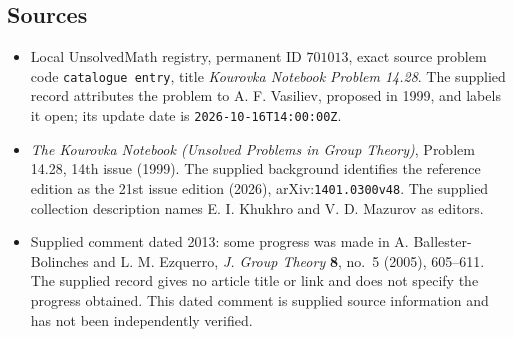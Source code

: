 \documentclass[11pt]{article}
\begin{document}
\subsection{Sources}
\begin{itemize}
\item Local UnsolvedMath registry, permanent ID \(701013\), exact source problem code \texttt{catalogue entry}, title \emph{Kourovka Notebook Problem 14.28}. The supplied record attributes the problem to A. F. Vasiliev, proposed in 1999, and labels it open; its update date is \texttt{2026-10-16T14:00:00Z}.
\item \emph{The Kourovka Notebook (Unsolved Problems in Group Theory)}, Problem 14.28, 14th issue (1999). The supplied background identifies the reference edition as the 21st issue edition (2026), arXiv:\texttt{1401.0300v48}. The supplied collection description names E. I. Khukhro and V. D. Mazurov as editors.
\item Supplied comment dated 2013: some progress was made in A. Ballester-Bolinches and L. M. Ezquerro, \emph{J. Group Theory} \textbf{8}, no.~5 (2005), 605--611. The supplied record gives no article title or link and does not specify the progress obtained. This dated comment is supplied source information and has not been independently verified.
\end{itemize}
\end{document}
